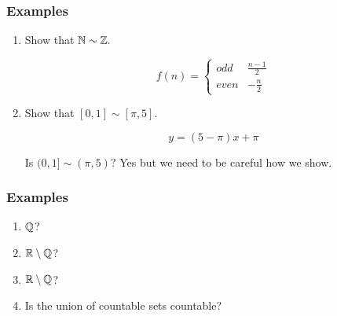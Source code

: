 \documentclass{report}
\begin{document}
\subsubsection{Examples}
\begin{enumerate}
  \item Show that $\NN \sim \ZZ.$
    \begin{myproof}
        
\[ 
 f(n) = 
  \begin{cases} 
  odd & \frac{n-1}{2} \\
  even & -\frac{n}{2}
   \end{cases}
\]
    \end{myproof}

  \item Show that $[0,1] \sim [\pi,5]$.
    \begin{myproof}
        $$y = (5- \pi)x + \pi$$
    \end{myproof}

    Is $(0,1] \sim (\pi,5)?$ Yes but we need to be careful how we show.
\end{enumerate}




\subsubsection{Examples}

\begin{enumerate}
  \item $\QQ$?
  \item $\RR \setminus \QQ$?
  \item $\RR \setminus \QQ$?
  \item Is the union of countable sets countable?
\end{enumerate}
\end{document}
